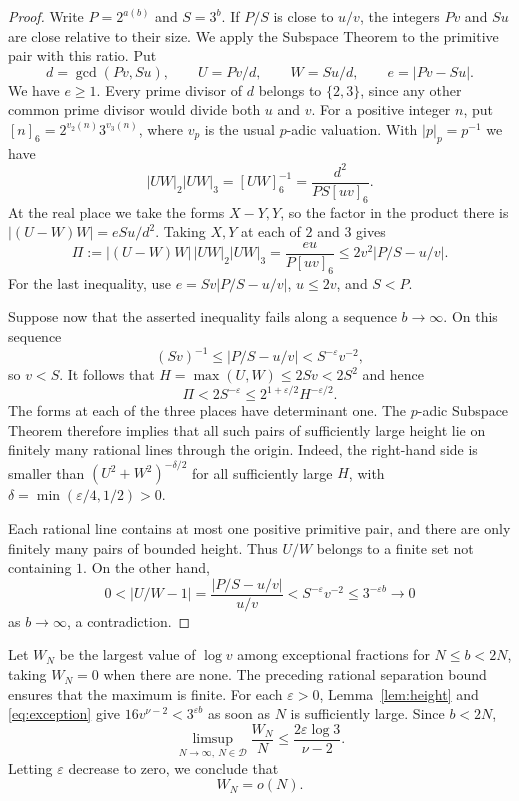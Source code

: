 \documentclass[11pt,reqno]{amsart}
\theoremstyle{definition}
\newcommand{\DD}{\mathcal D}
\begin{document}
\begin{proof}
Write $P=2^{a(b)}$ and $S=3^b$. If $P/S$ is close to $u/v$, the
integers $Pv$ and $Su$ are close relative to their size. We apply
the Subspace Theorem to the primitive pair with this ratio. Put
\[
 d=\gcd(Pv,Su),\qquad U=Pv/d,\qquad W=Su/d,\qquad e=|Pv-Su|.
\]
We have $e\ge1$. Every prime divisor of $d$ belongs to $\{2,3\}$,
since any other common prime divisor would divide both $u$ and $v$.
For a positive integer $n$, put $[n]_6=2^{v_2(n)}3^{v_3(n)}$, where
$v_p$ is the usual $p$-adic valuation. With $|p|_p=p^{-1}$ we have
\[
 |UW|_2|UW|_3=[UW]_6^{-1}=\frac{d^2}{PS[uv]_6}.
\]
At the real place we take the forms $X-Y,Y$, so the factor in the
product there is $|(U-W)W|=eSu/d^2$. Taking $X,Y$ at each of
$2$ and $3$ gives
\[
 \Pi:=|(U-W)W|\,|UW|_2|UW|_3
 =\frac{eu}{P[uv]_6}
 \le 2v^2|P/S-u/v|.
\]
For the last inequality, use $e=Sv|P/S-u/v|$, $u\le2v$, and $S<P$.

Suppose now that the asserted inequality fails along a sequence
$b\to\infty$. On this sequence
\[
 (Sv)^{-1}\le |P/S-u/v|<S^{-\varepsilon}v^{-2},
\]
so $v<S$. It follows that $H=\max(U,W)\le2Sv<2S^2$ and hence
\[
 \Pi<2S^{-\varepsilon}\le2^{1+\varepsilon/2}H^{-\varepsilon/2}.
\]
The forms at each of the three places have determinant one.
The $p$-adic Subspace Theorem
\cite[p.~246, (1.3)--(1.5)]{Schlickewei} therefore implies that
all such pairs of sufficiently large height lie on finitely many
rational lines through the origin.
Indeed, the right-hand side is smaller than $(U^2+W^2)^{-\delta/2}$
for all sufficiently large $H$, with
$\delta=\min(\varepsilon/4,1/2)>0$.

Each rational line contains at most one positive primitive
pair, and there are only finitely many pairs of bounded
height. Thus $U/W$ belongs to a finite set not containing
$1$. On the other hand,
\[
 0<|U/W-1|
 =\frac{|P/S-u/v|}{u/v}
 <S^{-\varepsilon}v^{-2}
 \le 3^{-\varepsilon b}\longrightarrow0
\]
as $b\to\infty$, a contradiction.
\end{proof}

Let $W_N$ be the largest value of $\log v$ among exceptional
fractions for $N\le b<2N$, taking $W_N=0$ when there are none.
The preceding rational separation bound ensures that the maximum
is finite. For each $\varepsilon>0$, Lemma~\ref{lem:height} and
\eqref{eq:exception} give $16v^{\nu-2}<3^{\varepsilon b}$ as
soon as $N$ is sufficiently large. Since $b<2N$,
\[
 \limsup_{N\to\infty,\ N\in\DD}\frac{W_N}{N}
 \le\frac{2\varepsilon\log3}{\nu-2}.
\]
Letting $\varepsilon$ decrease to zero, we conclude that
\begin{equation}\label{eq:height}
 W_N=o(N).
\end{equation}
\end{document}
